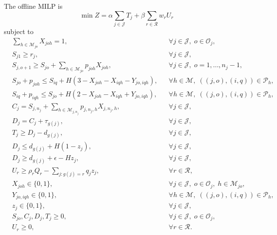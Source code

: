 \documentclass[a4paper,fleqn]{cas-sc}
\begin{document}
The offline MILP is
\begin{equation}
\min Z
=
\alpha\sum_{j\in\mathcal J}T_j
+\beta\sum_{r\in\mathcal R}w_rU_r
\label{eq:milp_obj}
\end{equation}
subject to
\begin{align}
&\sum_{h\in\mathcal M_{jo}}X_{joh}=1,
&&\forall j\in\mathcal J,\;o\in\mathcal O_j,
\label{eq:milp_assignment}\\
&S_{j1}\ge r_j,
&&\forall j\in\mathcal J,
\label{eq:milp_release}\\
&S_{j,o+1}\ge S_{jo}+\sum_{h\in\mathcal M_{jo}}p_{joh}X_{joh},
&&\forall j\in\mathcal J,\;o=1,\ldots,n_j-1,
\label{eq:milp_precedence}\\
&S_{jo}+p_{joh}\le S_{iq}
+H(3-X_{joh}-X_{iqh}-Y_{jo,iqh}),
&&\forall h\in\mathcal M,\;((j,o),(i,q))\in\mathcal P_h,
\label{eq:milp_nonoverlap_1}\\
&S_{iq}+p_{iqh}\le S_{jo}
+H(2-X_{joh}-X_{iqh}+Y_{jo,iqh}),
&&\forall h\in\mathcal M,\;((j,o),(i,q))\in\mathcal P_h,
\label{eq:milp_nonoverlap_2}\\
&C_j=S_{j,n_j}+\sum_{h\in\mathcal M_{j,n_j}}p_{j,n_j,h}X_{j,n_j,h},
&&\forall j\in\mathcal J,
\label{eq:milp_completion}\\
&D_j=C_j+\tau_{g(j)},
&&\forall j\in\mathcal J,
\label{eq:milp_delivery}\\
&T_j\ge D_j-d_{g(j)},
&&\forall j\in\mathcal J,
\label{eq:milp_tardiness}\\
&D_j\le d_{g(j)}+H(1-z_j),
&&\forall j\in\mathcal J,
\label{eq:milp_ontime_1}\\
&D_j\ge d_{g(j)}+\epsilon-Hz_j,
&&\forall j\in\mathcal J,
\label{eq:milp_ontime_2}\\
&U_r\ge \rho_rQ_r-\sum_{j:g(j)=r}q_jz_j,
&&\forall r\in\mathcal R,
\label{eq:milp_shortfall}\\
&X_{joh}\in\{0,1\},
&&\forall j\in\mathcal J,\;o\in\mathcal O_j,\;h\in\mathcal M_{jo},
\label{eq:milp_domain_x}\\
&Y_{jo,iqh}\in\{0,1\},
&&\forall h\in\mathcal M,\;((j,o),(i,q))\in\mathcal P_h,
\label{eq:milp_domain_y}\\
&z_j\in\{0,1\},
&&\forall j\in\mathcal J,
\label{eq:milp_domain_z}\\
&S_{jo},C_j,D_j,T_j\ge0,
&&\forall j\in\mathcal J,\;o\in\mathcal O_j,
\label{eq:milp_domain_time}\\
&U_r\ge0,
&&\forall r\in\mathcal R.
\label{eq:milp_domain_shortfall}
\end{align}
\end{document}
